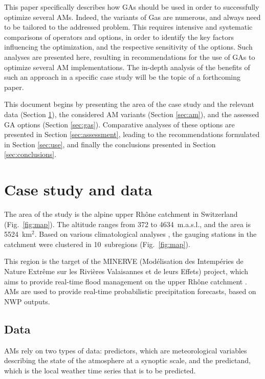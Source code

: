 \documentclass{ametsoc}
\begin{document}
This paper specifically describes how GAs should be used in order to successfully optimize several AMs. Indeed, the variants of Gas are numerous, and always need to be tailored to the addressed problem. This requires intensive and systematic comparisons of operators and options, in order to identify the key factors influencing the optimization, and the respective sensitivity of the options. Such analyses are presented here, resulting in recommendations for the use of GAs to optimize several AM implementations. The in-depth analysis of the benefits of such an approach in a specific case study will be the topic of a forthcoming paper. 

This document begins by presenting the area of the case study and the relevant data (Section \ref{sec:case_study_data}), the considered AM variants (Section \ref{sec:am}), and the assessed GA options (Section \ref{sec:gas}). Comparative analyses of these options are presented in Section \ref{sec:assessment}, leading to the recommendations formulated in Section \ref{sec:use}, and finally the conclusions presented in Section \ref{sec:conclusions}.


\section{Case study and data}
\label{sec:case_study_data}

The area of the study is the alpine upper Rh\^{o}ne catchment in Switzerland (Fig.\ \ref{fig:map}). The altitude ranges from 372 to 4634~m.a.s.l., and the area is 5524~km$^{2}$. Based on various climatological analyses \cite[see][for the details]{Horton2012a}, the gauging stations in the catchment were clustered in 10~subregions (Fig.\ \ref{fig:map}).

This region is the target of the MINERVE (Mod\'{e}lisation des Intemp\'{e}ries de Nature Extr\^{e}me sur les Rivi\`{e}res Valaisannes et de leurs Effets) project, which aims to provide real-time flood management on the upper Rh\^{o}ne catchment \citep{GarciaHernandez2009b}. AMs are used to provide real-time probabilistic precipitation forecasts, based on NWP outputs. 


\subsection{Data}
\label{sec:data}

AMs rely on two types of data: predictors, which are meteorological variables describing the state of the atmosphere at a synoptic scale, and the predictand, which is the local weather time series that is to be predicted.
\end{document}
